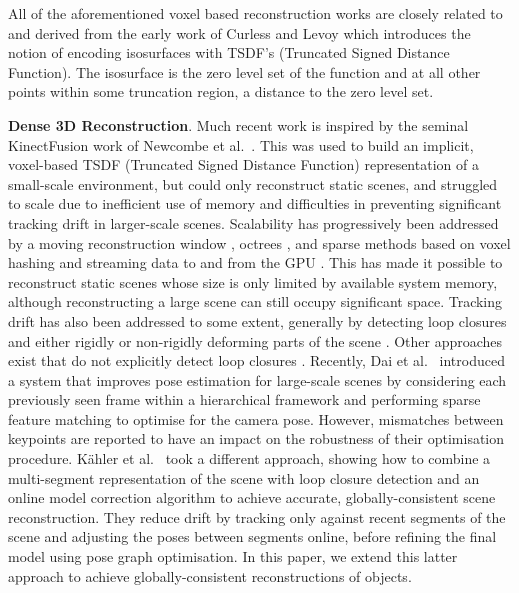 All of the aforementioned voxel based reconstruction works are closely related to and derived from the early work of Curless and Levoy \cite{Curless1996} 
which introduces the notion of encoding isosurfaces with TSDF's (Truncated Signed Distance Function). The isosurface is the zero level set of the function 
and at all other points within some truncation region, a distance to the zero level set.
\fi

\textbf{Dense 3D Reconstruction}. Much recent work is inspired by the seminal KinectFusion work of Newcombe et al.\ \cite{Newcombe2011}. This was used to build an implicit, voxel-based TSDF (Truncated Signed Distance Function) representation \cite{Curless1996} of a small-scale environment, but could only reconstruct static scenes, and struggled to scale due to inefficient use of memory and difficulties in preventing significant tracking drift in larger-scale scenes. Scalability has progressively been addressed by a moving reconstruction window \cite{Roth2012,Whelan2012}, octrees \cite{Zeng2012}, and sparse methods based on voxel hashing and streaming data to and from the GPU \cite{Niessner2013,Prisacariu2014}. This has made it possible to reconstruct static scenes whose size is only limited by available system memory, although reconstructing a large scene can still occupy significant space. Tracking drift has also been addressed to some extent, generally by detecting loop closures and either rigidly or non-rigidly deforming parts of the scene \cite{Zhou2013,Whelan2015IJRR,Whelan2015RSS}. Other approaches exist that do not explicitly detect loop closures \cite{Fioraio2015}. Recently, Dai et al.\ \cite{dai2016bundlefusion} introduced a system that improves pose estimation for large-scale scenes by considering each previously seen frame within a hierarchical framework and performing sparse feature matching to optimise for the camera pose. However, mismatches between keypoints are reported to have an impact on the robustness of their optimisation procedure. K{\"a}hler et al.\ \cite{Kahler2016} took a different approach, showing how to combine a multi-segment representation of the scene with loop closure detection and an online model correction algorithm to achieve accurate, globally-consistent scene reconstruction. They reduce drift by tracking only against recent segments of the scene and adjusting the poses between segments online, before refining the final model using pose graph optimisation. In this paper, we extend this latter approach to achieve globally-consistent reconstructions of objects.



